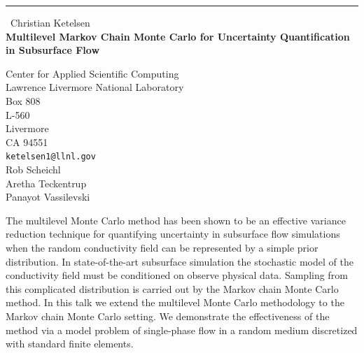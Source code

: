 \documentclass{report}
\begin{document}
\begin{center}
\rule{6in}{1pt} \
{\large Christian Ketelsen \\
{\bf Multilevel Markov Chain Monte Carlo for Uncertainty Quantification in Subsurface Flow }}

Center for Applied Scientific Computing \\ Lawrence Livermore National Laboratory \\ Box 808 \\ L-560 \\ Livermore \\ CA 94551
\\
{\tt ketelsen1@llnl.gov}\\
Rob Scheichl\\
Aretha Teckentrup\\
Panayot Vassilevski\end{center}

The multilevel Monte Carlo method has been shown to be an effective
variance reduction technique for quantifying uncertainty in subsurface
flow simulations when the random conductivity field can be represented by
a simple prior distribution. In state-of-the-art subsurface simulation
the stochastic model of the conductivity field must be conditioned on
observe physical data. Sampling from this complicated distribution is
carried out by the Markov chain Monte Carlo method. In this talk we
extend the multilevel Monte Carlo methodology to the Markov chain Monte
Carlo setting. We demonstrate the effectiveness of the method via a model
problem of single-phase flow in a random medium discretized with standard
finite elements.
\end{document}
